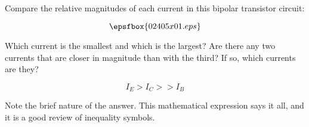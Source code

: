 

Compare the relative magnitudes of each current in this bipolar transistor circuit:

$$\epsfbox{02405x01.eps}$$

Which current is the smallest and which is the largest?  Are there any two currents that are closer in magnitude than with the third?  If so, which currents are they?







$$I_E > I_C >> I_B$$







Note the brief nature of the answer.  This mathematical expression says it all, and it is a good review of inequality symbols.




